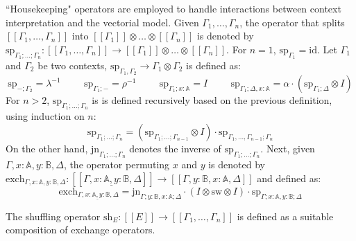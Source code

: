 ``Housekeeping" operators are employed to handle interactions between context interpretation and the vectorial model. Given $\Gamma_{1}, \ldots, \Gamma_{n}$, the operator that splits $[\![\Gamma_{1}, \ldots, \Gamma_{n}]\!]$ into $[\![\Gamma_{1}]\!] \otimes \ldots \otimes [\![\Gamma_{n}]\!]  $ is denoted by $\text{sp}_{\Gamma_1;\ldots;\Gamma_n}: [\![\Gamma_{1}, \ldots, \Gamma_{n}]\!] \xrightarrow{} [\![\Gamma_{1}]\!] \otimes \ldots \otimes [\![\Gamma_{n}]\!] $. For $n=1$, $\text{sp}_{\Gamma_1} = \text{id}$.
Let $\Gamma_1$ and $\Gamma_2$ be two contexts, $\text{sp}_{\Gamma_1, \Gamma_2} \rightarrow \Gamma_1\otimes \Gamma_2$ is defined as:
\begin{equation*}
  \text{sp}_{-; \Gamma_2} = \lambda^{-1} \hspace{1cm} \text{sp}_{\Gamma_1; -} = \rho^{-1} \hspace{1cm} \text{sp}_{\Gamma_1;x:\mathbb{A}} = I \hspace{1cm} \text{sp}_{\Gamma_1; \Delta, x: \mathbb{A}} = \alpha \cdot (\text{sp}_{\Gamma_1; \Delta} \otimes I)
\end{equation*}
For $n>2$, $\text{sp}_{\Gamma_1;\ldots;\Gamma_n}$ is is defined recursively based on the previous definition, using induction on $n$:
\begin{equation*}
  \text{sp}_{\Gamma_1;\ldots;\Gamma_n} = (\text{sp}_{\Gamma_1;\ldots;\Gamma_{n-1}} \otimes I )\cdot \text{sp}_{\Gamma_1, \ldots, \Gamma_{n-1} ;\Gamma_n}
\end{equation*}
On the other hand, $\text{jn}_{\Gamma_1;\ldots;\Gamma_n}$ denotes the inverse of $\text{sp}_{\Gamma_1;\ldots;\Gamma_n}$. Next, given $\Gamma, x : \mathbb{A}, y : \mathbb{B},\Delta$, the operator permuting $x$ and $y$ is denoted by $\text{exch}_{\Gamma, x : \mathbb{A}, y : \mathbb{B},\Delta}: [\![\Gamma,\underline{ x : \mathbb{A}, y : \mathbb{B}},\Delta]\!] \xrightarrow{} [\![\Gamma, y : \mathbb{B}, x : \mathbb{A}, \Delta]\!] $ and defined as:
\begin{equation*}
  \text{exch}_{\Gamma, \underline{ x : \mathbb{A}, y : \mathbb{B}},\Delta} = \text{jn}_{\Gamma; y:\mathbb{B}, x:\mathbb{A};\Delta} \cdot (I \otimes \text{sw} \otimes I ) \cdot \text{sp}_{\Gamma; x:\mathbb{A}, y:\mathbb{B};\Delta}
\end{equation*} 


The shuffling operator $\text{sh}_{E}: [\![E]\!] \xrightarrow{} [\![\Gamma_1, \ldots, \Gamma_n ]\!]$ is defined as a suitable composition of exchange operators.


